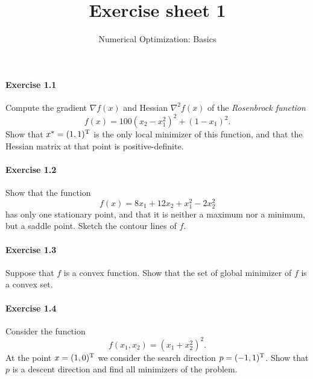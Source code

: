 
\subtitle{Numerical Optimization: Basics}
\title{Exercise sheet 1}
\date{}
\usepackage{amsmath}
\newcommand\tp{\ensuremath{\text{\upshape T}}}

\maketitle

\vspace{-12ex}

\paragraph{Exercise 1.1} %
Compute  the gradient $\nabla f(x)$ and Hessian $\nabla^2f(x)$ of the
\emph{Rosenbrock function}
\begin{equation}\label{eq:rosenbrock}
  f(x) = 100(x_2-x_1^2)^2 + (1-x_1)^2.
\end{equation}
Show that $x^*=(1,1)^\tp$ is the only local minimizer of this function, and
that the Hessian matrix at that point is positive-definite.

\paragraph{Exercise 1.2} %
Show that the function
\[
  f(x) = 8x_1 + 12x_2 + x_1^2 - 2x_2^2
\]
has only one stationary point, and that it is neither a maximum nor a minimum,
but a saddle point. Sketch the contour lines of $f$.

\paragraph{Exercise 1.3} %
Suppose that $f$ is a convex function. Show that the set of global minimizer
of $f$ is a convex set.

\paragraph{Exercise 1.4} %
Consider the function
\[
  f(x_1, x_2) = (x_1+x_2^2)^2.
\]
At the point $x=(1,0)^\tp$ we consider the search direction $p=(-1,1)^\tp$.
Show that $p$ is a descent direction and find all minimizers of the problem.

